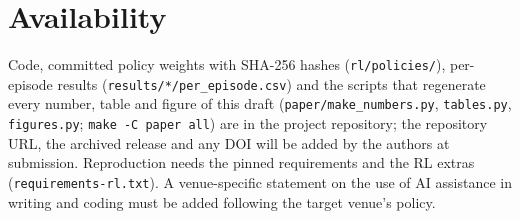 \section*{Availability}
Code, committed policy weights with SHA-256 hashes (\texttt{rl/policies/}), per-episode results (\texttt{results/*/per\_episode.csv}) and the scripts that regenerate every number, table and figure of this draft (\texttt{paper/make\_numbers.py}, \texttt{tables.py}, \texttt{figures.py}; \texttt{make -C paper all}) are in the project repository; the repository URL, the archived release and any DOI will be added by the authors at submission. Reproduction needs the pinned requirements and the RL extras (\texttt{requirements-rl.txt}). A venue-specific statement on the use of AI assistance in writing and coding must be added following the target venue's policy.
